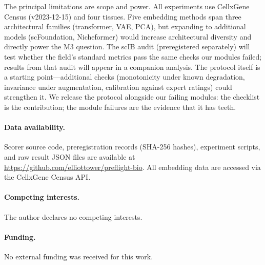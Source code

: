 \documentclass[9pt,lineno]{elife}
\begin{document}
The principal limitations are scope and power. All experiments use CellxGene Census (v2023-12-15) and four tissues. Five embedding methods span three architectural families (transformer, VAE, PCA), but expanding to additional models (scFoundation, Nicheformer) would increase architectural diversity and directly power the M3 question. The scIB audit (preregistered separately) will test whether the field's standard metrics pass the same checks our modules failed; results from that audit will appear in a companion analysis. The protocol itself is a starting point---additional checks (monotonicity under known degradation, invariance under augmentation, calibration against expert ratings) could strengthen it. We release the protocol alongside our failing modules: the checklist is the contribution; the module failures are the evidence that it has teeth.

\paragraph{Data availability.} Scorer source code, preregistration records (SHA-256 hashes), experiment scripts, and raw result JSON files are available at \url{https://github.com/elliottower/preflight-bio}. All embedding data are accessed via the CellxGene Census API.

\paragraph{Competing interests.} The author declares no competing interests.

\paragraph{Funding.} No external funding was received for this work.


\end{document}
